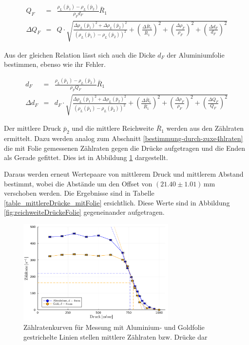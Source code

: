 \documentclass[12pt,a4paper]{scrartcl}
\numberwithin{equation}{section} %
\begin{document}
\begin{eqnarray}
	Q_F &=& \frac{\rho_L(\bar{p}_1) - \rho_L(\bar{p}_2)}{\rho_F d_F} \bar{R}_1
	\label{eq:Q_F} \\
	\Delta Q_F &=& Q \cdot \sqrt{\frac{{\Delta \rho_L(\bar{p}_1)}^2 + {\Delta \rho_L(\bar{p}_2)}^2}{\left(\rho_L(\bar{p}_1) - \rho_L(\bar{p}_2)\right)^2} + \left(\frac{\Delta \bar{R}_1}{\bar{R}_1}\right)^2 + \left(\frac{\Delta \rho_F}{\rho_F}\right)^2 + \left(\frac{\Delta d_F}{d_F}\right)^2}
\label{eq:fehler_Q_F}
\end{eqnarray}

\noindent
Aus der gleichen Relation lässt sich auch die Dicke $d_F$ der Aluminiumfolie bestimmen, ebenso wie ihr Fehler.

\begin{eqnarray}
	d_F &=& \frac{\rho_L(\bar{p}_1) - \rho_L(\bar{p}_2)}{\rho_F Q_F} \bar{R}_1 \label{eq:d_F} \\
	\Delta d_F &=& d_F \cdot
		\sqrt{\frac{{\Delta \rho_L(\bar{p}_1)}^2 + {\Delta \rho_L(\bar{p}_2)}^2}{\left(\rho_L(\bar{p}_1) - \rho_L(\bar{p}_2)\right)^2} + \left(\frac{\Delta \bar{R}_1}{\bar{R}_1}\right)^2 + \left(\frac{\Delta \rho_F}{\rho_F}\right)^2 + \left(\frac{\Delta Q_F}{Q_F}\right)^2}
	\label{eq:fehler_d_F}
\end{eqnarray}

\noindent
Der mittlere Druck $\bar{p}_2$ und die mittlere Reichweite $\bar{R}_1$ werden aus den Zählraten ermittelt. Dazu werden analog zum Abschnitt \ref{bestimmung-durch-zuxe4hlraten} die mit Folie gemessenen Zählraten gegen die Drücke aufgetragen und die Enden als Gerade  gefittet. Dies ist in Abbildung \ref{fig:zählraten mit folien} dargestellt.

\noindent
Daraus werden erneut Wertepaare von mittlerem Druck und mittlerem Abstand bestimmt, wobei die Abstände um den Offset von $(21.40 \pm 1.01) \mathrm{\, mm}$ verschoben werden. Die Ergebnisse sind in Tabelle \ref{table_mittlereDrücke_mitFolie} ersichtlich. Diese Werte sind in Abbildung \ref{fig:reichweiteDrückeFolie} gegeneinander aufgetragen.

\begin{figure}[H]
	\centering
	\includegraphics[width=0.7\textwidth]{../media/B3.3/zaehlraten.pdf}
	\caption{Zählratenkurven für Messung mit Aluminium- und Goldfolie \\
			gestrichelte Linien stellen mittlere Zählraten bzw. Drücke dar}
	\label{fig:zählraten mit folien}
\end{figure}
\end{document}
